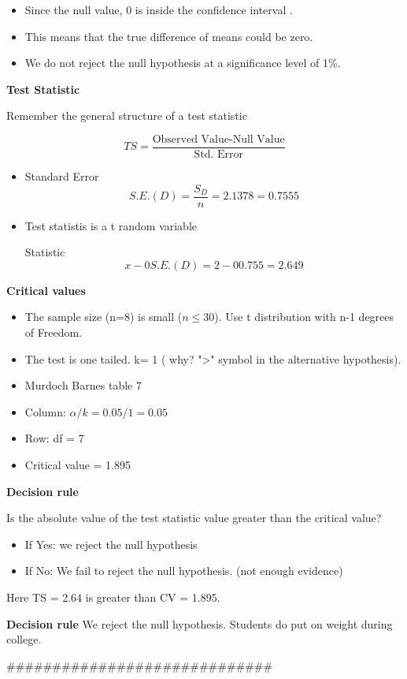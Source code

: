 \begin{itemize}
\item Since the null value, 0 is inside the confidence interval  .

\item This means that the true difference of means could be zero.

\item We do not reject the null hypothesis at a significance level of 1\%.

\end{itemize}


\noindent \textbf{Test Statistic}

Remember the general structure of a test statistic

\begin{framed}
\[TS =  \frac{\mbox{Observed Value-Null Value}}{\mbox{Std. Error}} \]
\end{framed}


\begin{itemize}
\item Standard Error\[S.E.(D) = \frac{S_D}{n}=2.1378= 0.7555\]

\item Test statistis is a t random variable

\itemTest Statistic\[x-0S.E.(D)=2 - 00.755= 2.649\]
\end{itemize}

\noindent \textbf{Critical values}

\begin{itemize}
\item The sample size (n=8) is small ($n \leq 30$). Use t distribution with n-1 degrees of Freedom.
\item The test is one tailed.  k= 1  ( why?  ">" symbol in the alternative hypothesis).
\item Murdoch Barnes table 7
\item Column:  $\alpha/k = 0.05/1= 0.05$
\item Row: df = 7
\item Critical value =  1.895    
\end{itemize}
\noindent \textbf{Decision rule}

\begin{framed}
\noindent Is the absolute value of the test statistic value greater than the critical value?
\begin{itemize}
\item If Yes: we reject the null hypothesis

\item If No: We fail to reject the null hypothesis. (not enough evidence)
\end{itemize}
\end{framed}

Here TS = 2.64  is greater than CV = 1.895.

\noindent \textbf{Decision rule}
We reject the null hypothesis. Students do put on weight during college. 


#############################






